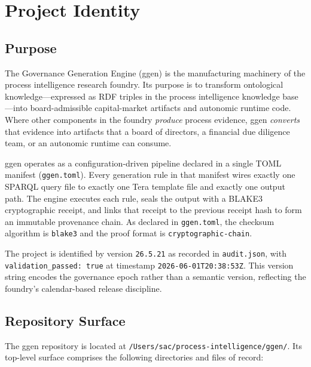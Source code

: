 
\section{Project Identity}
\label{sec:ggen-identity}

\subsection{Purpose}
\label{sec:ggen-identity-purpose}

The Governance Generation Engine (ggen) is the manufacturing machinery of the process intelligence
research foundry. Its purpose is to transform ontological knowledge---expressed as RDF triples in
the process intelligence knowledge base---into board-admissible capital-market artifacts and
autonomic runtime code. Where other components in the foundry \emph{produce} process evidence,
ggen \emph{converts} that evidence into artifacts that a board of directors, a financial due
diligence team, or an autonomic runtime can consume.

ggen operates as a configuration-driven pipeline declared in a single TOML manifest
(\texttt{ggen.toml}). Every generation rule in that manifest wires exactly one SPARQL query file
to exactly one Tera template file and exactly one output path. The engine executes each rule,
seals the output with a BLAKE3 cryptographic receipt, and links that receipt to the previous
receipt hash to form an immutable provenance chain. As declared in \texttt{ggen.toml}, the
checksum algorithm is \texttt{blake3} and the proof format is \texttt{cryptographic-chain}.

The project is identified by version \texttt{26.5.21} as recorded in \texttt{audit.json}, with
\texttt{validation\_passed: true} at timestamp \texttt{2026-06-01T20:38:53Z}. This version string
encodes the governance epoch rather than a semantic version, reflecting the foundry's
calendar-based release discipline.

\subsection{Repository Surface}
\label{sec:ggen-identity-surface}

The ggen repository is located at \texttt{/Users/sac/process-intelligence/ggen/}. Its top-level
surface comprises the following directories and files of record:

